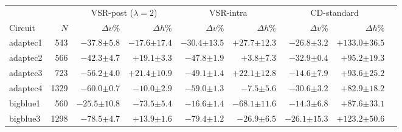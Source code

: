 \begin{tabular}{lrrrrrrrr}
\toprule
 & & \multicolumn{2}{c}{VSR-post ($\lambda=2$)} & \multicolumn{2}{c}{VSR-intra} & \multicolumn{2}{c}{CD-standard} \\
\cmidrule(lr){3-4} \cmidrule(lr){5-6} \cmidrule(lr){7-8}
Circuit & $N$ & $\Delta v\%$ & $\Delta h\%$ & $\Delta v\%$ & $\Delta h\%$ & $\Delta v\%$ & $\Delta h\%$ \\
\midrule
adaptec1 & 543 & $-37.8{\scriptscriptstyle\pm5.8}$ & $-17.6{\scriptscriptstyle\pm17.4}$ & $-30.4{\scriptscriptstyle\pm13.5}$ & $+27.7{\scriptscriptstyle\pm12.3}$ & $-26.8{\scriptscriptstyle\pm3.2}$ & $+133.0{\scriptscriptstyle\pm36.5}$ \\
adaptec2 & 566 & $-42.3{\scriptscriptstyle\pm4.7}$ & $+19.1{\scriptscriptstyle\pm3.3}$ & $-47.8{\scriptscriptstyle\pm1.9}$ & $+3.8{\scriptscriptstyle\pm7.3}$ & $-32.9{\scriptscriptstyle\pm0.4}$ & $+95.2{\scriptscriptstyle\pm19.3}$ \\
adaptec3 & 723 & $-56.2{\scriptscriptstyle\pm4.0}$ & $+21.4{\scriptscriptstyle\pm10.9}$ & $-49.1{\scriptscriptstyle\pm1.4}$ & $+22.1{\scriptscriptstyle\pm12.8}$ & $-14.6{\scriptscriptstyle\pm7.9}$ & $+93.6{\scriptscriptstyle\pm25.2}$ \\
adaptec4 & 1329 & $-60.0{\scriptscriptstyle\pm0.7}$ & $-10.0{\scriptscriptstyle\pm2.9}$ & $-59.0{\scriptscriptstyle\pm1.3}$ & $-7.5{\scriptscriptstyle\pm5.6}$ & $-30.6{\scriptscriptstyle\pm3.2}$ & $+82.9{\scriptscriptstyle\pm18.2}$ \\
bigblue1 & 560 & $-25.5{\scriptscriptstyle\pm10.8}$ & $-73.5{\scriptscriptstyle\pm5.4}$ & $-16.6{\scriptscriptstyle\pm1.4}$ & $-68.1{\scriptscriptstyle\pm11.6}$ & $-14.3{\scriptscriptstyle\pm6.8}$ & $+87.6{\scriptscriptstyle\pm33.1}$ \\
bigblue3 & 1298 & $-78.5{\scriptscriptstyle\pm4.7}$ & $+13.9{\scriptscriptstyle\pm1.6}$ & $-79.4{\scriptscriptstyle\pm1.2}$ & $-26.9{\scriptscriptstyle\pm6.5}$ & $-26.1{\scriptscriptstyle\pm15.3}$ & $+123.2{\scriptscriptstyle\pm50.6}$ \\
\bottomrule
\end{tabular}
